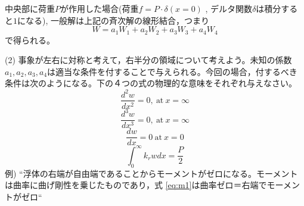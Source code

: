 \documentclass[dvipdfmx,a4paper]{jsarticle}
\begin{document}
    \vspace{1cm}
    
    中央部に荷重$P$が作用した場合(荷重$f=P\cdotp \delta(x=0)$ , デルタ関数$\delta$は積分すると$1$になる), 一般解は上記の斉次解の線形結合，つまり
    \begin{equation}
        W=a_1W_1+a_2W_2+a_3W_3+a_4W_4
    \end{equation}
    で得られる。
    
    \vspace{1cm}
    
    (2) 事象が左右に対称と考えて，右半分の領域について考えよう。未知の係数$a_1,a_2,a_3,a_4$は適当な条件を付することで与えられる。今回の場合，付するべき条件は次のようになる。下の４つの式の物理的な意味をそれぞれ与えなさい。
    \begin{equation}
        \frac{d^2w}{dx^2}=0,\ \text{at}\ x=\infty
        \label{eq:m1}
    \end{equation}
    \begin{equation}
        \frac{d^3w}{dx^3}=0,\ \text{at}\ x=\infty
        \label{eq:m2}
    \end{equation}
    \begin{equation}
        \frac{dw}{dx}=0\ \text{at}\ x=0
        \label{eq:m3}
    \end{equation}
    \begin{equation}
        \int_0^{\infty}k_rwdx=\frac{P}{2}
        \label{eq:m4}
    \end{equation}
    例) “浮体の右端が自由端であることからモーメントがゼロになる。モーメントは曲率に曲げ剛性を乗じたものであり，式 \eqref{eq:m1}は曲率ゼロ＝右端でモーメントがゼロ“
\end{document}
